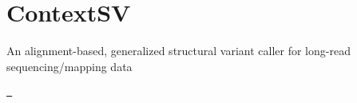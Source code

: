 \chapter{Context\+SV}
\hypertarget{md__r_e_a_d_m_e}{}\label{md__r_e_a_d_m_e}
\label{md__r_e_a_d_m_e_autotoc_md13}%
%
An alignment-\/based, generalized structural variant caller for long-\/read sequencing/mapping data

\href{https://github.com/WGLab/ContextSV/actions/workflows/build-tests.yml}{\texttt{ }} 